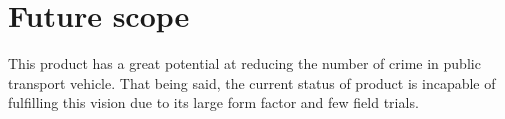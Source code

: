 \section{Future scope}
This product has a great potential at reducing the number of crime in public transport vehicle. That being said, the current status of product is incapable of fulfilling this vision due to its large form factor and few field trials. 
